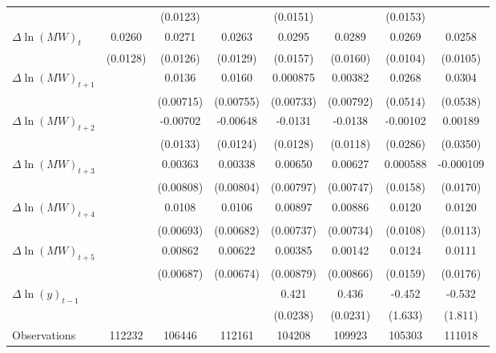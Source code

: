 {\begin{tabular}{l*{7}{c}}
          &                  & (0.0123)         &                  & (0.0151)         &                  & (0.0153)         &                  \\
[1em]
$\Delta \ln(MW)_{t}$&   0.0260\sym{**} &   0.0271\sym{**} &   0.0263\sym{**} &   0.0295\sym{*}  &   0.0289\sym{*}  &   0.0269\sym{**} &   0.0258\sym{**} \\
          & (0.0128)         & (0.0126)         & (0.0129)         & (0.0157)         & (0.0160)         & (0.0104)         & (0.0105)         \\
[1em]
$\Delta \ln(MW)_{t+1}$&                  &   0.0136\sym{*}  &   0.0160\sym{**} & 0.000875         &  0.00382         &   0.0268         &   0.0304         \\
          &                  &(0.00715)         &(0.00755)         &(0.00733)         &(0.00792)         & (0.0514)         & (0.0538)         \\
[1em]
$\Delta \ln(MW)_{t+2}$&                  & -0.00702         & -0.00648         &  -0.0131         &  -0.0138         & -0.00102         &  0.00189         \\
          &                  & (0.0133)         & (0.0124)         & (0.0128)         & (0.0118)         & (0.0286)         & (0.0350)         \\
[1em]
$\Delta \ln(MW)_{t+3}$&                  &  0.00363         &  0.00338         &  0.00650         &  0.00627         & 0.000588         &-0.000109         \\
          &                  &(0.00808)         &(0.00804)         &(0.00797)         &(0.00747)         & (0.0158)         & (0.0170)         \\
[1em]
$\Delta \ln(MW)_{t+4}$&                  &   0.0108         &   0.0106         &  0.00897         &  0.00886         &   0.0120         &   0.0120         \\
          &                  &(0.00693)         &(0.00682)         &(0.00737)         &(0.00734)         & (0.0108)         & (0.0113)         \\
[1em]
$\Delta \ln(MW)_{t+5}$&                  &  0.00862         &  0.00622         &  0.00385         &  0.00142         &   0.0124         &   0.0111         \\
          &                  &(0.00687)         &(0.00674)         &(0.00879)         &(0.00866)         & (0.0159)         & (0.0176)         \\
[1em]
$\Delta \ln(y)_{t-1}$&                  &                  &                  &    0.421\sym{***}&    0.436\sym{***}&   -0.452         &   -0.532         \\
          &                  &                  &                  & (0.0238)         & (0.0231)         &  (1.633)         &  (1.811)         \\
\hline
Observations&   112232         &   106446         &   112161         &   104208         &   109923         &   105303         &   111018         \\
\hline\hline
\end{tabular}
}

